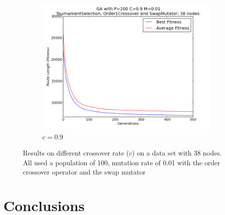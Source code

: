 \documentclass[10pt, a4paper]{article}
\begin{document}
\begin{figure}[h]
\begin{subfigure}[b]{0.67\textwidth}
\includegraphics[width=\textwidth]{img/results/order1crossover/swapmutator/n38p100c09m001}
\caption{$c = 0.9$}
\end{subfigure}
\caption{Results on different crossover rate ($c$) on a data set with 38 nodes.
         All used a population of 100, mutation rate of 0.01 with the order
         crossover operator and the swap mutator}
\label{fig:crossover-rate-results}
\end{figure}

\section{Conclusions}




\end{document}
